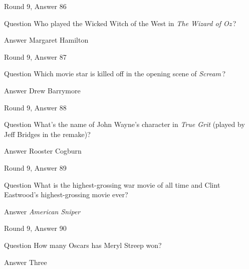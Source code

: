 \documentclass[11pt]{beamer}
\begin{document}
\begin{frame}[t]{Round 9, Answer 86}
\vspace{2em}
\begin{block}{Question}
Who played the Wicked Witch of the West in \emph{The Wizard of Oz}\,?
\end{block}
\pause{}
\begin{block}{Answer}
Margaret Hamilton
\end{block}
\end{frame}
    

\begin{frame}[t]{Round 9, Answer 87}
\vspace{2em}
\begin{block}{Question}
Which movie star is killed off in the opening scene of \emph{Scream}\,?
\end{block}
\pause{}
\begin{block}{Answer}
Drew Barrymore
\end{block}
\end{frame}
    

\begin{frame}[t]{Round 9, Answer 88}
\vspace{2em}
\begin{block}{Question}
What's the name of John Wayne's character in \emph{True Grit} (played by Jeff Bridges in the remake)?
\end{block}
\pause{}
\begin{block}{Answer}
Rooster Cogburn
\end{block}
\end{frame}
    

\begin{frame}[t]{Round 9, Answer 89}
\vspace{2em}
\begin{block}{Question}
What is the highest-grossing war movie of all time and Clint Eastwood's highest-grossing movie ever?
\end{block}
\pause{}
\begin{block}{Answer}
\emph{American Sniper}
\end{block}
\end{frame}
    

\begin{frame}[t]{Round 9, Answer 90}
\vspace{2em}
\begin{block}{Question}
How many Oscars has Meryl Streep won?
\end{block}
\pause{}
\begin{block}{Answer}
Three
\end{block}
\end{frame}
    
\end{document}
